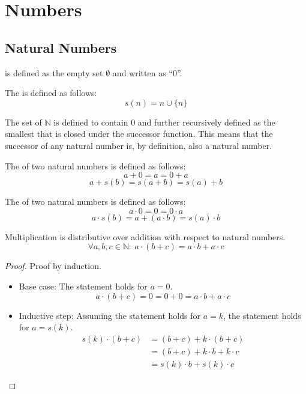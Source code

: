 \documentclass[main.tex]{subfiles}
\begin{document}
\chapter{Numbers}

\section{Natural Numbers}

\begin{de}
   is defined as the empty set $\emptyset$ and written as ``$0$''.
\end{de}

\begin{de}
  The  is defined as follows:
  \[ s(n) = n \cup \{n\} \]
\end{de}

\begin{de}
  The set of  $\mathbb{N}$ is defined to contain $0$ and further recursively defined as the smallest that is closed under the successor function.
  This means that the successor of any natural number is, by definition, also a natural number.
\end{de}

\begin{de}
  The  of two natural numbers is defined as follows:
  \[ a + 0 = a = 0 + a\]
  \[ a + s(b) = s(a+b) = s(a) + b \]
\end{de}

\begin{de}
  The  of two natural numbers is defined as follows:
  \[ a \cdot 0 = 0 = 0 \cdot a \]
  \[ a \cdot s(b) = a + (a\cdot b) = s(a) \cdot b\]
\end{de}

\begin{pr}
  Multiplication is distributive over addition with respect to natural numbers.
  \[ \forall a, b, c \in \mathbb{N}:\ a \cdot (b + c) = a \cdot b + a \cdot c \]

  \begin{proof}
    Proof by induction.
    \noindent
    \begin{itemize}
        \item Base case: The statement holds for $a = 0$.
          \[ a \cdot (b + c) = 0 = 0 + 0 = a \cdot b + a \cdot c \]
        \item Inductive step: Assuming the statement holds for $a = k$, the statement holds for $a = s(k)$.
          \begin{align*}
            s(k) \cdot (b + c)
            &= (b + c) + k \cdot (b + c)\\
            &= (b + c) + k \cdot b + k \cdot c\\
            &= s(k) \cdot b + s(k) \cdot c
          \end{align*}
    \end{itemize}
  \end{proof}
\end{pr}
\end{document}
